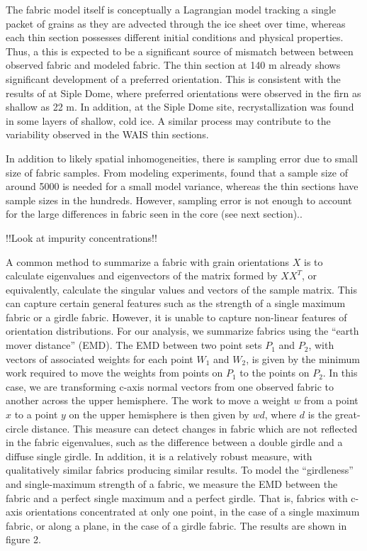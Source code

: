 \documentclass{igs}
\begin{document}
The fabric model itself is conceptually a Lagrangian model tracking a single packet of grains as they are advected through the ice sheet over time, whereas each thin section possesses different initial conditions and physical properties. Thus, a this is expected to be a significant source of mismatch between between observed fabric and modeled fabric. The thin section at 140 m already shows significant development of a preferred orientation. This is consistent with the results of \citet{diprinzio2005} at Siple Dome, where preferred orientations were observed in the firn as shallow as 22 m. In addition, at the Siple Dome site, recrystallization was found in some layers of shallow, cold ice. A similar process may contribute to the variability observed in the WAIS thin sections.

 In addition to likely spatial inhomogeneities, there is sampling error due to small size of fabric samples. From modeling experiments, \citet{thorsteinsson2002nni} found that a sample size of around 5000 is needed for a small model variance, whereas the thin sections have sample sizes in the hundreds. However, sampling error is not enough to account for the large differences in fabric seen in the core (see next section)..    

!!Look at impurity concentrations!!

A common method to summarize a fabric with grain orientations $X$ is to calculate eigenvalues and eigenvectors of the matrix formed by $X X^T$, or equivalently, calculate the singular values and vectors of the sample matrix. This can capture certain general features such as the strength of a single maximum fabric or a girdle fabric. However, it is unable to capture non-linear features of orientation distributions. For our analysis, we summarize fabrics using the ``earth mover distance'' (EMD). The EMD between two point sets $P_1$ and $P_2$, with vectors of associated weights for each point $W_1$ and $W_2$, is given by the minimum work required to move the weights from points on $P_1$ to the points on $P_2$. In this case, we are transforming c-axis normal vectors from one observed fabric to another across the upper hemisphere. The work to move a weight $w$ from a point $x$ to a point $y$ on the upper hemisphere is then given by ${wd}$, where $d$ is the great-circle distance. This measure can detect changes in fabric which are not reflected in the fabric eigenvalues, such as the difference between a double girdle and a diffuse single girdle. In addition, it is a relatively robust measure, with qualitatively similar fabrics producing similar results. To model the ``girdleness'' and single-maximum strength of a fabric, we measure the EMD between the fabric and a perfect single maximum and a perfect girdle. That is, fabrics with c-axis orientations concentrated at only one point, in the case of a single maximum fabric, or along a plane, in the case of a girdle fabric. The results are shown in figure 2. 
\end{document}
